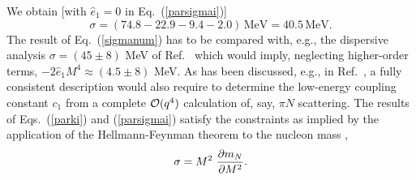 \documentclass[twoside,12pt]{article}
\begin{document}
   We obtain [with $\hat{e}_1=0$ in Eq.\ (\ref {parsigmai})]
\begin{equation}
\label{sigmanum}
\sigma=(74.8-22.9-9.4-2.0)\,\mbox{MeV}=40.5\, \mbox{MeV}.
\end{equation}
   The result of Eq.\ (\ref{sigmanum}) has to be compared with, e.g., the
dispersive analysis $\sigma=(45\pm 8)$ MeV of Ref.\ \cite{Gasser:1990ce}
which would imply, neglecting higher-order terms, $-2\hat{e}_1 M^4 \approx (4.5\pm 8)$
MeV.
   As has been discussed, e.g., in Ref.\ \cite{Becher:1999he},
a fully consistent description would also require to determine
the low-energy coupling constant $c_1$ from a complete ${\cal O}(q^4)$
calculation of, say, $\pi N$ scattering.
   The results of Eqs.\ (\ref{parki}) and (\ref{parsigmai}) satisfy the
constraints as implied by the application of the Hellmann-Feynman theorem
to the nucleon mass \cite{Gasser:1987rb},
\begin{equation}
\sigma =M^2 \ {\partial m_N\over \partial M^2}.
\label{fhrelation}
\end{equation}
\end{document}
